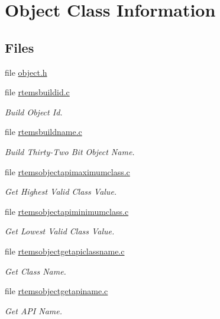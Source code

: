 \hypertarget{group__ClassicClassInfo}{}\section{Object Class Information}
\label{group__ClassicClassInfo}
\subsection*{Files}
\begin{DoxyCompactItemize}
\item 
file \mbox{\hyperlink{rtems_2object_8h}{object.\+h}}
\item 
file \mbox{\hyperlink{rtemsbuildid_8c}{rtemsbuildid.\+c}}
\begin{DoxyCompactList}\small\item\em Build Object Id. \end{DoxyCompactList}\item 
file \mbox{\hyperlink{rtemsbuildname_8c}{rtemsbuildname.\+c}}
\begin{DoxyCompactList}\small\item\em Build Thirty-\/\+Two Bit Object Name. \end{DoxyCompactList}\item 
file \mbox{\hyperlink{rtemsobjectapimaximumclass_8c}{rtemsobjectapimaximumclass.\+c}}
\begin{DoxyCompactList}\small\item\em Get Highest Valid Class Value. \end{DoxyCompactList}\item 
file \mbox{\hyperlink{rtemsobjectapiminimumclass_8c}{rtemsobjectapiminimumclass.\+c}}
\begin{DoxyCompactList}\small\item\em Get Lowest Valid Class Value. \end{DoxyCompactList}\item 
file \mbox{\hyperlink{rtemsobjectgetapiclassname_8c}{rtemsobjectgetapiclassname.\+c}}
\begin{DoxyCompactList}\small\item\em Get Class Name. \end{DoxyCompactList}\item 
file \mbox{\hyperlink{rtemsobjectgetapiname_8c}{rtemsobjectgetapiname.\+c}}
\begin{DoxyCompactList}\small\item\em Get A\+PI Name. \end{DoxyCompactList}\item 

\end{DoxyCompactItemize}
